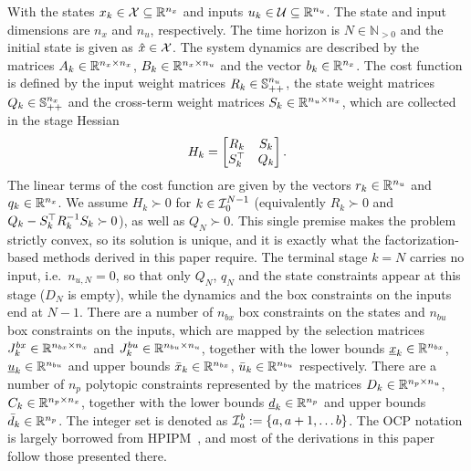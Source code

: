 With the states $x_k \in\mathcal{X}\subseteq\mathbb{R}^{n_x}$ and inputs $u_k \in\mathcal{U}\subseteq\mathbb{R}^{n_u}$.
The state and input dimensions are $n_x$ and $n_u$, respectively.
The time horizon is $N \in \mathbb{N}_{>0}$ and the initial state is given as $\hat{x} \in \mathcal{X}$.
The system dynamics are described by the matrices $A_k \in \mathbb{R}^{n_x \times n_x}$, $B_k \in \mathbb{R}^{n_x \times n_u}$ and the vector $b_k \in \mathbb{R}^{n_x}$.
The cost function is defined by the input weight matrices $R_k \in \mathbb{S}_{++}^{n_u}$, the state weight matrices $Q_k \in \mathbb{S}_{++}^{n_x}$ and the cross-term weight matrices $S_k \in \mathbb{R}^{n_u \times n_x}$, which are collected in the stage Hessian
\[
H_k = \begin{bmatrix} R_k & S_k \\ S_k^\top & Q_k \end{bmatrix}.
\]
The linear terms of the cost function are given by the vectors $r_k \in \mathbb{R}^{n_u}$ and $q_k \in \mathbb{R}^{n_x}$.
We assume $H_k \succ 0$ for $k \in \mathcal{I}_{0}^{N-1}$ (equivalently $R_k \succ 0$ and $Q_k - S_k^\top R_k^{-1} S_k \succ 0$), as well as $Q_N \succ 0$.
This single premise makes the problem strictly convex, so its solution is unique, and it is exactly what the factorization-based methods derived in this paper require.
The terminal stage $k=N$ carries no input, i.e.\ $n_{u,N} = 0$, so that only $Q_N$, $q_N$ and the state constraints appear at this stage ($D_N$ is empty), while the dynamics and the box constraints on the inputs end at $N-1$.
There are a number of $n_{bx}$ box constraints on the states and $n_{bu}$ box constraints on the inputs, which are mapped by the selection matrices $J_k^{bx}\in\mathbb{R}^{n_{bx} \times n_x}$ and $J_k^{bu}\in\mathbb{R}^{n_{bu} \times n_u}$, together with the lower bounds $\underline{x}_k\in\mathbb{R}^{n_{bx}}$, $\underline{u}_k\in\mathbb{R}^{n_{bu}}$ and upper bounds $\bar{x}_k\in\mathbb{R}^{n_{bx}}$, $\bar{u}_k\in\mathbb{R}^{n_{bu}}$ respectively.
There are a number of $n_p$ polytopic constraints represented by the matrices $D_k\in\mathbb{R}^{n_p \times n_u}$, $C_k\in\mathbb{R}^{n_p \times n_x}$, together with the lower bounds $\underline{d}_k\in\mathbb{R}^{n_p}$ and upper bounds $\bar{d}_k\in\mathbb{R}^{n_p}$.
The integer set is denoted as $\mathcal{I}_{a}^{b} := \lbrace a, a+1, \dots b \rbrace$.
The OCP notation is largely borrowed from HPIPM~\cite{frison2020hpipm}, and most of the derivations in this paper follow those presented there.

\newpage